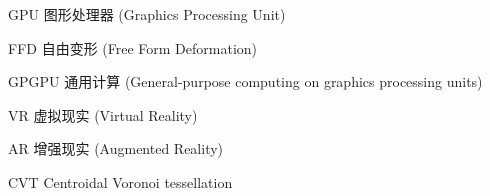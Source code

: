 \begin{denotation}

\item[GPU] 图形处理器 (Graphics Processing Unit)
\item[FFD] 自由变形 (Free Form Deformation)
\item[GPGPU] 通用计算 (General-purpose computing on graphics processing units)
\item[VR] 虚拟现实 (Virtual Reality)
\item[AR] 增强现实 (Augmented Reality)
\item[CVT] Centroidal Voronoi tessellation

\end{denotation}
